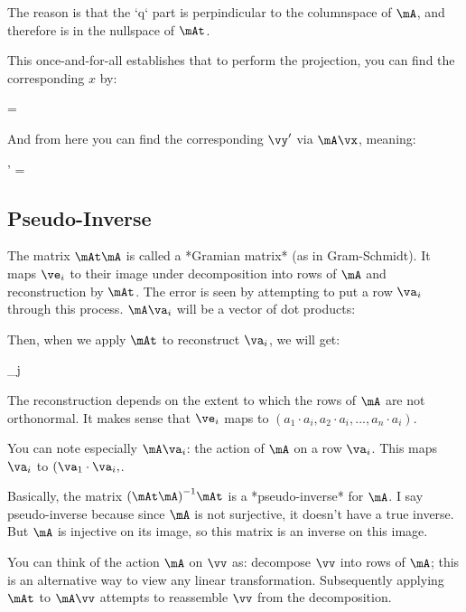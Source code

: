 The reason is that the `q` part is perpindicular to the columnspace of
$\mA$, and therefore is in the nullspace of $\mAt$.

This once-and-for-all establishes that to perform the projection, you
can find the corresponding $x$ by:

\begin{nedqn}
  \vx = \parensinv{\mAt \mA} \parens{\mAt \vy}
\end{nedqn}

And from here you can find the corresponding $\vy'$ via $\mA\vx$,
meaning:

\begin{nedqn}
  \vy' = \mA \parensinv{\mAt \mA} \parens{\mAt \vy}
\end{nedqn}

\subsection{Pseudo-Inverse}

The matrix $\mAt \mA$ is called a *Gramian matrix* (as in Gram-Schmidt).
It maps $\ve_i$ to their image under decomposition into rows of $\mA$
and reconstruction by $\mAt$. The error is seen by attempting to put a
row $\va_i$ through this process. $\mA \va_i$ will be a vector of dot
products:

\begin{nedqn}
\end{nedqn}

\noindent
Then, when we apply $\mAt$ to reconstruct $\va_i$, we will get:

\begin{nedqn}
  \sum \va_j 
\end{nedqn}

The reconstruction depends on the extent to which the rows of $\mA$ are
not orthonormal. It makes sense that $\ve_i$ maps to $(a_1 \cdot a_i,
a_2 \cdot a_i, ..., a_n \cdot a_i)$.

You can note especially $\mA \va_i$: the action of $\mA$ on a row
$\va_i$. This maps $\va_i$ to $(\va_1 \cdot \va_i,$.

Basically, the matrix $\parensinv{\mAt \mA} \mAt$ is a *pseudo-inverse*
for $\mA$. I say pseudo-inverse because since $\mA$ is not surjective, it
doesn't have a true inverse. But $\mA$ is injective on its image, so
this matrix is an inverse on this image.

You can think of the action $\mA$ on $\vv$ as: decompose $\vv$ into rows
of $\mA$; this is an alternative way to view any linear transformation.
Subsequently applying $\mAt$ to $\mA\vv$ attempts to reassemble $\vv$
from the decomposition.

